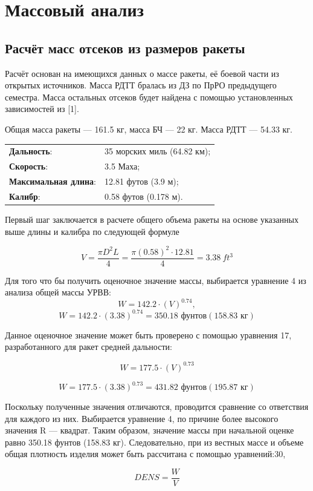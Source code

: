 \documentclass[a4paper,12pt]{report}
\begin{document}
\chapter{Массовый анализ}
\section{Расчёт масс отсеков из размеров ракеты}
Расчёт основан на имеющихся данных о массе ракеты, её боевой части из открытых источников. Масса РДТТ бралась из ДЗ по ПрРО предыдущего семестра. Масса остальных отсеков будет найдена
с помощью установленных зависимостей из [1].

Общая масса ракеты — 161.5 кг, масса БЧ — 22 кг. Масса РДТТ — 54.33 кг.

\begin{tabular}{ll}
    \textbf{Дальность}: & 35 морских миль (64.82 км); \\
    \textbf{Скорость}: & 3.5 Маха; \\
    \textbf{Максимальная длина}: & 12.81 футов (3.9 м); \\
    \textbf{Калибр}: & 0.58 футов (0.178 м).
\end{tabular}

Первый шаг заключается в расчете общего объема ракеты на основе
указанных выше длины и калибра по следующей формуле

\[V = \frac{\pi D^2 L}{4} = \frac{\pi (0.58)^2 \cdot 12.81}{4} = \SI{3.38}{ft^3}\]

Для того что
бы получить оценочное значение массы, выбирается уравнение 4 из анализа общей массы УРВВ:
\[W = 142.2\cdot(V)^{0.74},\]
\[W = 142.2 \cdot (3.38)^{0.74} = 350.18\text{ фунтов}(158.83\text{ кг})\] 

Данное оценочное значение может быть проверено с помощью уравнения 17, разработанного для ракет средней дальности:

\[ W = 177.5\cdot(V)^{0.73} \]

\[ W = 177.5\cdot(3.38)^{0.73} = 431.82 \text{ фунтов}(195.87\text{ кг}) \]

 Поскольку полученные значения отличаются, проводится сравнение со
ответствия для каждого из них. Выбирается уравнение 4, по причине более высокого значения R — квадрат. Таким образом, значение массы при
 начальной оценке равно 350.18 фунтов (158.83 кг). Следовательно, при из
вестных массе и объеме общая плотность изделия может быть рассчитана
 с помощью уравнений:30,


\[ \textit{DENS} = \frac{\textit{W}}{\textit{V}} \]
\end{document}

